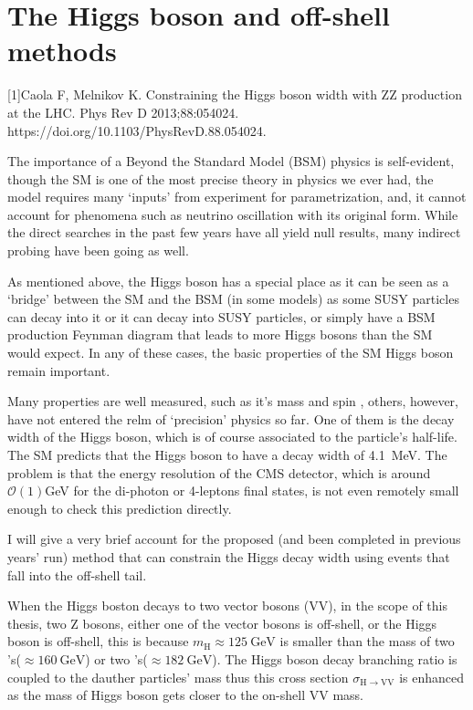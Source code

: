 \section{The Higgs boson and off-shell methods}\label{sec:physics_offshell}
[1]Caola F, Melnikov K. Constraining the Higgs boson width with ZZ production at the LHC. Phys Rev D 2013;88:054024. https://doi.org/10.1103/PhysRevD.88.054024.

The importance of a Beyond the Standard Model (BSM) physics is self-evident, though the SM is one
of the most precise theory in physics we ever had, the model requires many `inputs' from experiment
for parametrization, and, it cannot account for phenomena such as neutrino oscillation with its
original form. While the direct searches in the past few years have all yield null results,
many indirect probing have been going as well.

As mentioned above, the Higgs boson has a special place as it can be seen as a `bridge' between
the SM and the BSM (in some models) as some SUSY particles can decay into it or it can decay
into SUSY particles, or simply have a BSM production Feynman diagram that leads to more Higgs
bosons than the SM would expect. In any of these cases, the basic properties of the SM Higgs
boson remain important.

Many properties are well measured, such as it's mass and spin \cite{higgs_papers}, others, however,
have not entered the relm of `precision' physics so far. One of them is the decay width of
the Higgs boson, which is of course associated to the particle's half-life. The SM predicts
that the Higgs boson to have a decay width of \SI{4.1}{\mega\electronvolt}. The problem is
that the energy resolution of the CMS detector, which is around $\mathcal{O}(1)$\si{\giga\electronvolt}
for the di-photon or 4-leptons final states, is not even remotely small enough to check this 
prediction directly.

I will give a very brief account\cite{ulascan} for the proposed (and been completed in previous years' run)
method that can constrain the Higgs decay width using events that fall into the off-shell
tail.

When the Higgs boston decays to two vector bosons (VV), in the scope of this thesis, two Z bosons,
either one of the vector bosons is off-shell, or the Higgs boson is off-shell, this is because
$m_\text{H}\approx\SI{125}{\giga\electronvolt}$ is smaller than the 
mass of two \PW{}'s($\approx\SI{160}{\giga\electronvolt}$) 
or two \PZ{}'s($\approx\SI{182}{\giga\electronvolt}$). The Higgs boson decay branching ratio
is coupled to the dauther particles' mass thus this cross section
$\sigma_{\mathrm{H}\rightarrow\mathrm{VV}}$ is enhanced as the mass of Higgs boson gets closer to 
the on-shell VV mass.  

